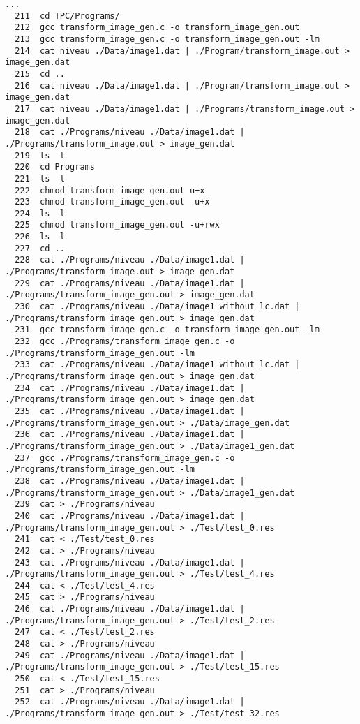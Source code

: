 \documentclass[11pt]{article}
\begin{document}
\begin{verbatim}
...
  211  cd TPC/Programs/
  212  gcc transform_image_gen.c -o transform_image_gen.out
  213  gcc transform_image_gen.c -o transform_image_gen.out -lm
  214  cat niveau ./Data/image1.dat | ./Program/transform_image.out > image_gen.dat
  215  cd ..
  216  cat niveau ./Data/image1.dat | ./Program/transform_image.out > image_gen.dat
  217  cat niveau ./Data/image1.dat | ./Programs/transform_image.out > image_gen.dat
  218  cat ./Programs/niveau ./Data/image1.dat | ./Programs/transform_image.out > image_gen.dat
  219  ls -l
  220  cd Programs
  221  ls -l
  222  chmod transform_image_gen.out u+x
  223  chmod transform_image_gen.out -u+x
  224  ls -l
  225  chmod transform_image_gen.out -u+rwx
  226  ls -l
  227  cd ..
  228  cat ./Programs/niveau ./Data/image1.dat | ./Programs/transform_image.out > image_gen.dat
  229  cat ./Programs/niveau ./Data/image1.dat | ./Programs/transform_image_gen.out > image_gen.dat
  230  cat ./Programs/niveau ./Data/image1_without_lc.dat | ./Programs/transform_image_gen.out > image_gen.dat
  231  gcc transform_image_gen.c -o transform_image_gen.out -lm
  232  gcc ./Programs/transform_image_gen.c -o ./Programs/transform_image_gen.out -lm
  233  cat ./Programs/niveau ./Data/image1_without_lc.dat | ./Programs/transform_image_gen.out > image_gen.dat
  234  cat ./Programs/niveau ./Data/image1.dat | ./Programs/transform_image_gen.out > image_gen.dat
  235  cat ./Programs/niveau ./Data/image1.dat | ./Programs/transform_image_gen.out > ./Data/image_gen.dat
  236  cat ./Programs/niveau ./Data/image1.dat | ./Programs/transform_image_gen.out > ./Data/image1_gen.dat
  237  gcc ./Programs/transform_image_gen.c -o ./Programs/transform_image_gen.out -lm
  238  cat ./Programs/niveau ./Data/image1.dat | ./Programs/transform_image_gen.out > ./Data/image1_gen.dat
  239  cat > ./Programs/niveau
  240  cat ./Programs/niveau ./Data/image1.dat | ./Programs/transform_image_gen.out > ./Test/test_0.res
  241  cat < ./Test/test_0.res 
  242  cat > ./Programs/niveau
  243  cat ./Programs/niveau ./Data/image1.dat | ./Programs/transform_image_gen.out > ./Test/test_4.res
  244  cat < ./Test/test_4.res 
  245  cat > ./Programs/niveau
  246  cat ./Programs/niveau ./Data/image1.dat | ./Programs/transform_image_gen.out > ./Test/test_2.res
  247  cat < ./Test/test_2.res 
  248  cat > ./Programs/niveau
  249  cat ./Programs/niveau ./Data/image1.dat | ./Programs/transform_image_gen.out > ./Test/test_15.res
  250  cat < ./Test/test_15.res 
  251  cat > ./Programs/niveau
  252  cat ./Programs/niveau ./Data/image1.dat | ./Programs/transform_image_gen.out > ./Test/test_32.res

\end{verbatim}
\end{document}
